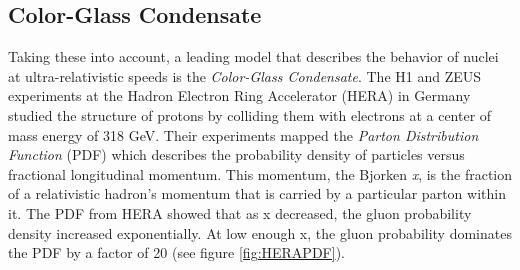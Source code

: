 \subsection{Color-Glass Condensate}
Taking these into account, a leading model that describes the behavior of nuclei at ultra-relativistic speeds is the \textit{Color-Glass Condensate}. The H1 and ZEUS experiments at the Hadron Electron Ring Accelerator (HERA) in Germany studied the structure of protons by colliding them with electrons at a center of mass energy of 318 GeV\citep{Abramowicz2015}. Their experiments mapped the \textit{Parton Distribution Function} (PDF) which describes the probability density of particles versus fractional longitudinal momentum. This momentum, the Bjorken \textit{x}, is the fraction of a relativistic hadron's momentum that is carried by a particular parton within it. The PDF from HERA showed that as x decreased, the gluon probability density increased exponentially. At low enough x, the gluon probability dominates the PDF by a factor of 20 (see figure \ref{fig:HERAPDF}). 

